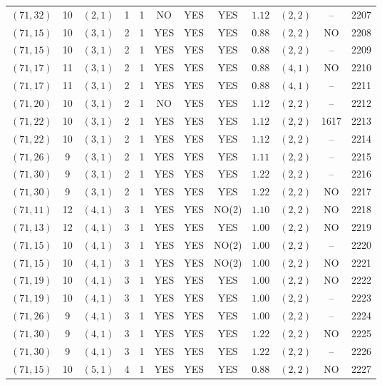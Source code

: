 \begin{longtable}{|c|c|c|c|c|c|c|c|c|c|c|c|}
$(71,32)$ & 10 & $(2,1)$ & 1 & 1 & NO & YES & YES & $1.12$ & $(2,2)$ & -- & 2207\\
$(71,15)$ & 10 & $(3,1)$ & 2 & 1 & YES & YES & YES & $0.88$ & $(2,2)$ & NO & 2208\\
$(71,15)$ & 10 & $(3,1)$ & 2 & 1 & YES & YES & YES & $0.88$ & $(2,2)$ & -- & 2209\\
$(71,17)$ & 11 & $(3,1)$ & 2 & 1 & YES & YES & YES & $0.88$ & $(4,1)$ & NO & 2210\\
$(71,17)$ & 11 & $(3,1)$ & 2 & 1 & YES & YES & YES & $0.88$ & $(4,1)$ & -- & 2211\\
$(71,20)$ & 10 & $(3,1)$ & 2 & 1 & NO & YES & YES & $1.12$ & $(2,2)$ & -- & 2212\\
$(71,22)$ & 10 & $(3,1)$ & 2 & 1 & YES & YES & YES & $1.12$ & $(2,2)$ & 1617 & 2213\\
$(71,22)$ & 10 & $(3,1)$ & 2 & 1 & YES & YES & YES & $1.12$ & $(2,2)$ & -- & 2214\\
$(71,26)$ & 9 & $(3,1)$ & 2 & 1 & YES & YES & YES & $1.11$ & $(2,2)$ & -- & 2215\\
$(71,30)$ & 9 & $(3,1)$ & 2 & 1 & YES & YES & YES & $1.22$ & $(2,2)$ & -- & 2216\\
$(71,30)$ & 9 & $(3,1)$ & 2 & 1 & YES & YES & YES & $1.22$ & $(2,2)$ & NO & 2217\\
$(71,11)$ & 12 & $(4,1)$ & 3 & 1 & YES & YES & NO(2) & $1.10$ & $(2,2)$ & NO & 2218\\
$(71,13)$ & 12 & $(4,1)$ & 3 & 1 & YES & YES & YES & $1.00$ & $(2,2)$ & NO & 2219\\
$(71,15)$ & 10 & $(4,1)$ & 3 & 1 & YES & YES & NO(2) & $1.00$ & $(2,2)$ & -- & 2220\\
$(71,15)$ & 10 & $(4,1)$ & 3 & 1 & YES & YES & NO(2) & $1.00$ & $(2,2)$ & NO & 2221\\
$(71,19)$ & 10 & $(4,1)$ & 3 & 1 & YES & YES & YES & $1.00$ & $(2,2)$ & NO & 2222\\
$(71,19)$ & 10 & $(4,1)$ & 3 & 1 & YES & YES & YES & $1.00$ & $(2,2)$ & -- & 2223\\
$(71,26)$ & 9 & $(4,1)$ & 3 & 1 & YES & YES & YES & $1.00$ & $(2,2)$ & -- & 2224\\
$(71,30)$ & 9 & $(4,1)$ & 3 & 1 & YES & YES & YES & $1.22$ & $(2,2)$ & NO & 2225\\
$(71,30)$ & 9 & $(4,1)$ & 3 & 1 & YES & YES & YES & $1.22$ & $(2,2)$ & -- & 2226\\
$(71,15)$ & 10 & $(5,1)$ & 4 & 1 & YES & YES & YES & $0.88$ & $(2,2)$ & NO & 2227\\

\end{longtable}

